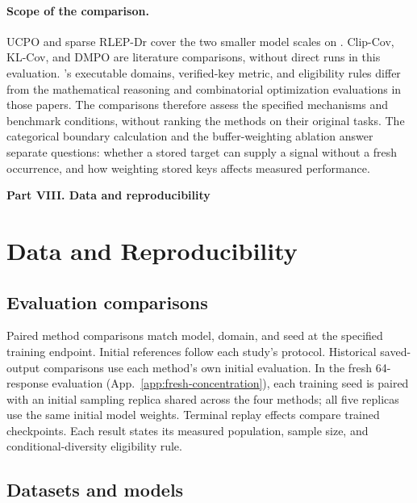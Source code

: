 \paragraph{Scope of the comparison.}
UCPO and sparse RLEP-Dr cover the two smaller model scales on \mb{}.
Clip-Cov, KL-Cov, and DMPO are literature comparisons, without direct runs
in this evaluation. \mb{}'s executable domains, verified-key metric, and
eligibility rules differ from the mathematical reasoning and combinatorial
optimization evaluations in those papers. The comparisons therefore assess
the specified mechanisms and benchmark conditions, without ranking the
methods on their original tasks. The categorical boundary calculation and
the buffer-weighting ablation answer separate questions: whether a stored
target can supply a signal without a fresh occurrence, and how weighting
stored keys affects measured performance.

\clearpage
{}
\begin{center}\large\textbf{Part VIII. Data and reproducibility}\end{center}

\section{Data and Reproducibility}
\label{app:reproducibility}

\subsection{Evaluation comparisons}
\label{app:source-integrity}
\label{app:initial-provenance}
\label{app:scheduled-provenance}

Paired method comparisons match model, domain, and seed at the specified
training endpoint. Initial references follow each study's protocol.
Historical saved-output comparisons use each method's own initial evaluation.
In the fresh 64-response evaluation (App.~\ref{app:fresh-concentration}),
each training seed is paired with an initial sampling replica shared across
the four methods; all five replicas use the same initial model weights.
Terminal replay effects compare trained checkpoints. Each result states its
measured population, sample size, and conditional-diversity eligibility rule.

\subsection{Datasets and models}
\label{app:repro-artifacts}
\label{app:repro-code}
\label{app:archived-models}

